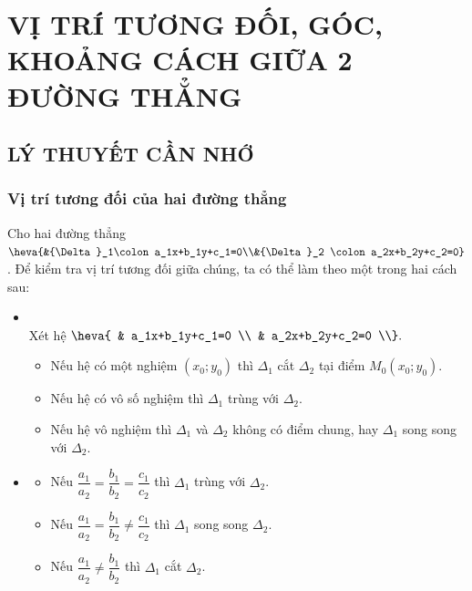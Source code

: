 \section{VỊ TRÍ TƯƠNG ĐỐI, GÓC, KHOẢNG CÁCH GIỮA 2 ĐƯỜNG THẲNG}
\subsection{LÝ THUYẾT CẦN NHỚ}

\subsubsection{ Vị trí tương đối của hai đường thẳng}
Cho hai đường thẳng $\heva{&{\Delta}_1\colon a_1x+b_1y+c_1=0\\&{\Delta}_2 \colon a_2x+b_2y+c_2=0}$. Để kiểm tra vị trí tương đối giữa chúng, ta có thể làm theo một trong hai cách sau:
\begin{itemize}
	\item [\iconMT] \\
	Xét hệ $\heva{
		& a_1x+b_1y+c_1=0 \\ 
		& a_2x+b_2y+c_2=0 \\}.$
	\begin{boxkn}
		\begin{itemize}
			\item Nếu hệ có một nghiệm $\left(x_0;y_0\right)$ thì ${\Delta}_1$ cắt ${\Delta}_2$ tại điểm $M_0\left(x_0;y_0\right).$
			\item Nếu hệ có vô số nghiệm thì ${\Delta}_1$ trùng với ${\Delta}_2$.
			\item Nếu hệ vô nghiệm thì ${\Delta}_1$ và ${\Delta}_2$ không có điểm chung, hay ${\Delta}_1$ song song với ${\Delta}_2$.
		\end{itemize}
	\end{boxkn}
	\item [\iconMT] 
	\begin{boxkn}
		\begin{itemize}
			\item Nếu $\dfrac{a_1}{a_2}=\dfrac{b_1}{b_2}=\dfrac{c_1}{c_2}$ thì ${\Delta}_1$ trùng với ${\Delta}_2$.
			\item Nếu $\dfrac{a_1}{a_2}=\dfrac{b_1}{b_2}\ne \dfrac{c_1}{c_2}$ thì ${\Delta}_1$ song song ${\Delta}_2$.
			\item  Nếu $\dfrac{a_1}{a_2}\ne \dfrac{b_1}{b_2}$ thì ${\Delta}_1$ cắt ${\Delta}_2$.
		\end{itemize}
	\end{boxkn}
\end{itemize}

